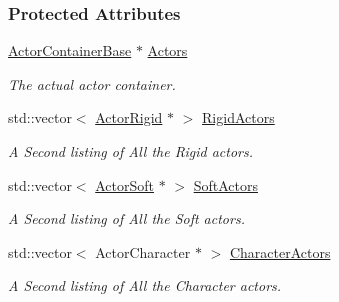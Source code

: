 \subsubsection*{Protected Attributes}
\begin{DoxyCompactItemize}
\item 
\hypertarget{classphys_1_1ActorManager_a7e6b7f66bdcf78475a2b07f8acac0418}{
\hyperlink{classphys_1_1ActorContainerBase}{ActorContainerBase} $\ast$ \hyperlink{classphys_1_1ActorManager_a7e6b7f66bdcf78475a2b07f8acac0418}{Actors}}
\label{d3/dcf/classphys_1_1ActorManager_a7e6b7f66bdcf78475a2b07f8acac0418}

\begin{DoxyCompactList}\small\item\em The actual actor container. \item\end{DoxyCompactList}\item 
\hypertarget{classphys_1_1ActorManager_aeef3741b00d08ab6a51ba2962429ba4d}{
std::vector$<$ \hyperlink{classphys_1_1ActorRigid}{ActorRigid} $\ast$ $>$ \hyperlink{classphys_1_1ActorManager_aeef3741b00d08ab6a51ba2962429ba4d}{RigidActors}}
\label{d3/dcf/classphys_1_1ActorManager_aeef3741b00d08ab6a51ba2962429ba4d}

\begin{DoxyCompactList}\small\item\em A Second listing of All the Rigid actors. \item\end{DoxyCompactList}\item 
\hypertarget{classphys_1_1ActorManager_a36ceb34508b78c5c13cba1dfc833b0f4}{
std::vector$<$ \hyperlink{classphys_1_1ActorSoft}{ActorSoft} $\ast$ $>$ \hyperlink{classphys_1_1ActorManager_a36ceb34508b78c5c13cba1dfc833b0f4}{SoftActors}}
\label{d3/dcf/classphys_1_1ActorManager_a36ceb34508b78c5c13cba1dfc833b0f4}

\begin{DoxyCompactList}\small\item\em A Second listing of All the Soft actors. \item\end{DoxyCompactList}\item 
\hypertarget{classphys_1_1ActorManager_a3c2d7fb69bc1573182dd13c598a56c4f}{
std::vector$<$ ActorCharacter $\ast$ $>$ \hyperlink{classphys_1_1ActorManager_a3c2d7fb69bc1573182dd13c598a56c4f}{CharacterActors}}
\label{d3/dcf/classphys_1_1ActorManager_a3c2d7fb69bc1573182dd13c598a56c4f}

\begin{DoxyCompactList}\small\item\em A Second listing of All the Character actors. \item\end{DoxyCompactList}\end{DoxyCompactItemize}


